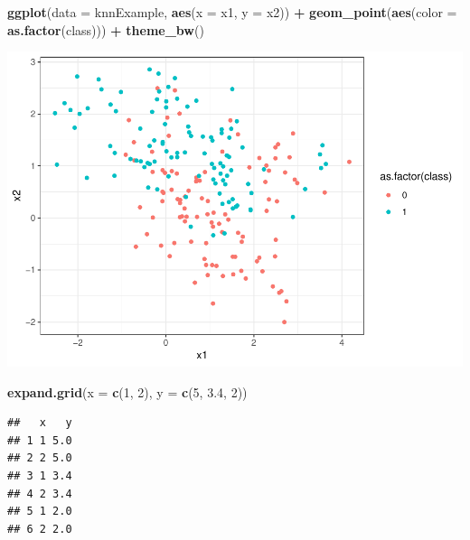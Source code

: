 \documentclass[]{article}
\newenvironment{Shaded}{\begin{snugshade}}{\end{snugshade}}
\newcommand{\KeywordTok}[1]{\textcolor[rgb]{0.13,0.29,0.53}{\textbf{#1}}}
\newcommand{\DataTypeTok}[1]{\textcolor[rgb]{0.13,0.29,0.53}{#1}}
\newcommand{\DecValTok}[1]{\textcolor[rgb]{0.00,0.00,0.81}{#1}}
\newcommand{\FloatTok}[1]{\textcolor[rgb]{0.00,0.00,0.81}{#1}}
\newcommand{\StringTok}[1]{\textcolor[rgb]{0.31,0.60,0.02}{#1}}
\newcommand{\OperatorTok}[1]{\textcolor[rgb]{0.81,0.36,0.00}{\textbf{#1}}}
\newcommand{\NormalTok}[1]{#1}
\begin{document}
\begin{Shaded}
\begin{Highlighting}[]
\KeywordTok{ggplot}\NormalTok{(}\DataTypeTok{data =}\NormalTok{ knnExample, }\KeywordTok{aes}\NormalTok{(}\DataTypeTok{x =}\NormalTok{ x1, }\DataTypeTok{y =}\NormalTok{ x2)) }\OperatorTok{+}
\StringTok{    }\KeywordTok{geom_point}\NormalTok{(}\KeywordTok{aes}\NormalTok{(}\DataTypeTok{color =} \KeywordTok{as.factor}\NormalTok{(class))) }\OperatorTok{+}
\StringTok{    }\KeywordTok{theme_bw}\NormalTok{()}
\end{Highlighting}
\end{Shaded}

\includegraphics{stt-301-programming_files/figure-latex/unnamed-chunk-185-1.pdf}

\begin{Shaded}
\begin{Highlighting}[]
\KeywordTok{expand.grid}\NormalTok{(}\DataTypeTok{x =} \KeywordTok{c}\NormalTok{(}\DecValTok{1}\NormalTok{, }\DecValTok{2}\NormalTok{), }\DataTypeTok{y =} \KeywordTok{c}\NormalTok{(}\DecValTok{5}\NormalTok{, }\FloatTok{3.4}\NormalTok{, }\DecValTok{2}\NormalTok{))}
\end{Highlighting}
\end{Shaded}

\begin{verbatim}
##   x   y
## 1 1 5.0
## 2 2 5.0
## 3 1 3.4
## 4 2 3.4
## 5 1 2.0
## 6 2 2.0
\end{verbatim}

\begin{Shaded}
\end{Shaded}
\end{document}
